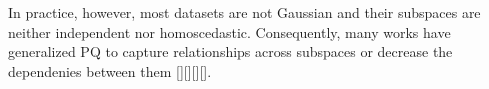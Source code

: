 In practice, however, most datasets are not Gaussian and their subspaces are neither independent nor homoscedastic. Consequently, many works have generalized PQ to capture relationships across subspaces or decrease the dependenies between them [][][][].






